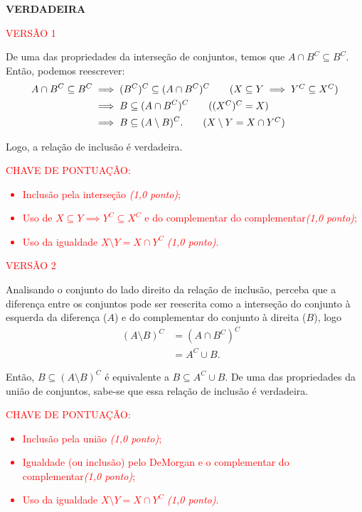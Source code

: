 \textbf{VERDADEIRA}

\textcolor{red}{ VERSÃO 1 } %

De uma das propriedades da interseção de conjuntos, temos que $A \cap B^{C}
    \subseteq B^{C}$. Então, podemos reescrever:
\begin{align*}
    A \cap B^{C} \subseteq B^{C} & \implies (B^{C})^{C} \subseteq (A \cap B^{C})^{C} \tag{$X \subseteq Y \implies Y^C \subseteq X^C$} \\
                                 & \implies B \subseteq (A \cap B^{C})^{C} \tag{$(X^C)^C = X$}                                        \\
                                 & \implies B \subseteq (A \setminus B)^{C} . \tag{$X\setminus Y  = X \cap Y^{C}$}
\end{align*}

Logo, a relação de inclusão é verdadeira.

\bigskip

\textcolor{red}{CHAVE DE PONTUAÇÃO:
    \begin{itemize}
        \item  Inclusão pela interseção \emph{(1,0 ponto)};
        \item Uso de $X \subseteq Y \implies Y^C \subseteq X^C$ e do complementar do
              complementar\emph{(1,0 ponto)};
        \item  Uso da igualdade $X \setminus Y = X \cap Y^C$ \emph{(1,0 ponto)}.
    \end{itemize} }

\bigskip

\textcolor{red}{ VERSÃO 2} %

Analisando o conjunto do lado direito da relação de inclusão, perceba que a
diferença entre os conjuntos pode ser reescrita como a interseção do conjunto à
esquerda da diferença ($A$) e do complementar do conjunto à direita ($B$), logo
\begin{align}
    (A\setminus B)^{C} & = (A \cap B^{C})^{C} & \tag{diferença de conjuntos}    \\
                       & = A^{C} \cup B.      & \tag{De Morgan e $(X^C)^C = X$}
\end{align}

Então, $B \subseteq (A \setminus B)^{C}$ é equivalente a $B \subseteq A^{C}
    \cup B$. De uma das propriedades da união de conjuntos, sabe-se que essa
relação de inclusão é verdadeira.

\bigskip



\textcolor{red}{CHAVE DE PONTUAÇÃO:
    \begin{itemize}
        \item  Inclusão pela união \emph{(1,0 ponto)};
        \item  Igualdade (ou inclusão) pelo DeMorgan e o complementar do
              complementar\emph{(1,0 ponto)};
        \item  Uso da igualdade $X \setminus Y = X \cap Y^C$ \emph{(1,0 ponto)}.
    \end{itemize} }
